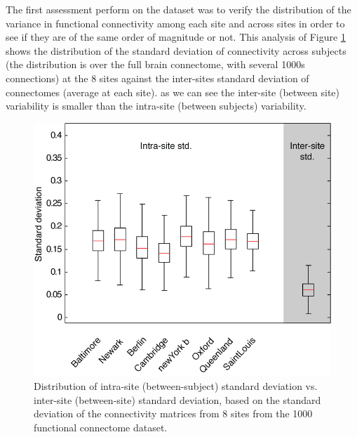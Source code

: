 \documentclass[authoryear]{elsarticle}
\begin{document}


The first assessment perform on the dataset was to verify the distribution of the variance in functional connectivity among each site and across sites in order to see if they are of the same order of magnitude or not. This analysis of Figure \ref{fig_site_variability} shows the distribution of the standard deviation of connectivity across subjects (the distribution is over the full brain connectome, with several 1000s connections) at the 8 sites against the inter-sites standard deviation of connectomes (average at each site). as we can see the inter-site (between site) variability is smaller than the intra-site (between subjects) variability.

\begin{figure}[H!]
\begin{center}
\includegraphics[width=\linewidth]{../figures/inter_vs_intra_3tonly.png}
\end{center}
\caption[inter vs. intra site variability]{
  Distribution of intra-site (between-subject) standard deviation vs. inter-site (between-site) standard deviation, based on the standard deviation of the connectivity matrices from 8 sites from the 1000 functional connectome dataset.
}
\label{fig_site_variability}
\end{figure}
\end{document}
